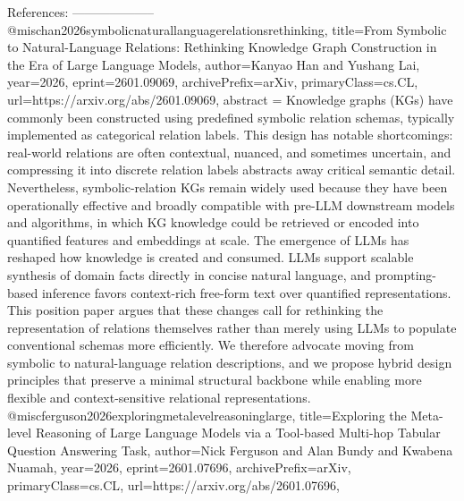         References:
        --------------------
        @misc{han2026symbolicnaturallanguagerelationsrethinking,
      title={From Symbolic to Natural-Language Relations: Rethinking Knowledge Graph Construction in the Era of Large Language Models}, 
      author={Kanyao Han and Yushang Lai},
      year={2026},
      eprint={2601.09069},
      archivePrefix={arXiv},
      primaryClass={cs.CL},
      url={https://arxiv.org/abs/2601.09069},
      abstract = {Knowledge graphs (KGs) have commonly been constructed using predefined symbolic relation schemas, typically implemented as categorical relation labels. This design has notable shortcomings: real-world relations are often contextual, nuanced, and sometimes uncertain, and compressing it into discrete relation labels abstracts away critical semantic detail. Nevertheless, symbolic-relation KGs remain widely used because they have been operationally effective and broadly compatible with pre-LLM downstream models and algorithms, in which KG knowledge could be retrieved or encoded into quantified features and embeddings at scale. The emergence of LLMs has reshaped how knowledge is created and consumed. LLMs support scalable synthesis of domain facts directly in concise natural language, and prompting-based inference favors context-rich free-form text over quantified representations. This position paper argues that these changes call for rethinking the representation of relations themselves rather than merely using LLMs to populate conventional schemas more efficiently. We therefore advocate moving from symbolic to natural-language relation descriptions, and we propose hybrid design principles that preserve a minimal structural backbone while enabling more flexible and context-sensitive relational representations.}
}@misc{ferguson2026exploringmetalevelreasoninglarge,
      title={Exploring the Meta-level Reasoning of Large Language Models via a Tool-based Multi-hop Tabular Question Answering Task}, 
      author={Nick Ferguson and Alan Bundy and Kwabena Nuamah},
      year={2026},
      eprint={2601.07696},
      archivePrefix={arXiv},
      primaryClass={cs.CL},
      url={https://arxiv.org/abs/2601.07696},
}
